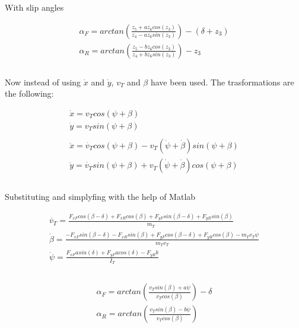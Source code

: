\documentclass{report}
\begin{document}
With slip angles

\begin{equation}
\begin{aligned}
\alpha_F = arctan(\frac{z_5+a z_6 cos(z_3)}{z_4-a z_6 sin(z_3)}) - (\delta + z_3)\\
\alpha_R = arctan(\frac{z_5-b z_6 cos(z_3)}{z_4+b z_6 sin(z_3)}) - z_3\\\\
\end{aligned}
\end{equation}

Now instead of using $\dot{x}$ and $\dot{y}$, $v_T$ and $\beta$ have been used. The trasformations are the following: 

\begin{equation}
\begin{aligned}
\dot{x} = v_T cos(\psi + \beta)\\
\dot{y} = v_T sin(\psi + \beta)\\\\
\ddot{x} = \dot{v_T} cos(\psi + \beta) - v_T (\dot{\psi} + \dot{\beta}) sin(\psi + \beta)\\
\ddot{y} = \dot{v_T} sin(\psi + \beta) + v_T (\dot{\psi} + \dot{\beta}) cos(\psi + \beta)\\\\
\end{aligned}
\end{equation}

Substituting and simplyfing with the help of Matlab

\begin{equation}
\begin{aligned}
\dot{v_T} = \frac{F_{xF} cos(\beta-\delta) + F_{xR} cos(\beta) + F_{yF} sin(\beta-\delta) + F_{yR} sin(\beta)}{m_T} \\
\dot{\beta} = \frac{-F_{xF} sin(\beta-\delta) - F_{xR} sin(\beta) + F_{yF} cos(\beta-\delta) + F_{yR} cos(\beta) - m_T v_T \dot{\psi}}{m_T v_T} \\
\ddot{\psi} = \frac{F_{xF} a sin(\delta) + F_{yF} a cos(\delta) - F_{yR} b}{I_T} \\\\
\end{aligned}
\end{equation}

\begin{equation}
\begin{aligned}
\alpha_F = arctan(\frac{v_T sin(\beta) + a\dot{\psi}}{v_T cos(\beta)}) - \delta\\
\alpha_R = arctan(\frac{v_T sin(\beta) - b\dot{\psi}}{v_T cos(\beta)}) \\\\
\end{aligned}
\end{equation}
\end{document}
